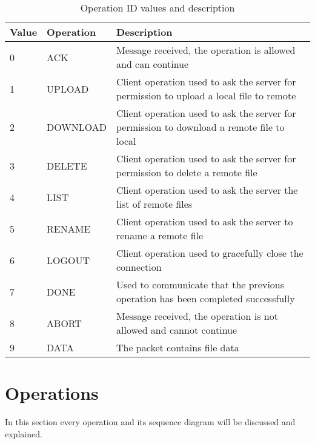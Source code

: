 \begin{longtable}{|p{}|p{}|p{}|}
	\caption{Operation ID values and description}
	\label{Operation ID list} 
	\label{tab:operation-ids-list} \\
	\hline
	\textbf{Value} & \textbf{Operation} & \textbf{Description} \\
	\hline
	 0 & ACK & Message received, the operation is allowed and can continue \\
	\hline
	 1 & UPLOAD & Client operation used to ask the server for permission to upload a local file to remote \\
	\hline
	 2 & DOWNLOAD & Client operation used to ask the server for permission to download a remote file to local \\
	\hline
	 3 & DELETE & Client operation used to ask the server for permission to delete a remote file \\
	\hline
	 4 & LIST & Client operation used to ask the server the list of remote files  \\
	\hline
	 5 & RENAME & Client operation used to ask the server to rename a remote file \\
	\hline
	 6 & LOGOUT & Client operation used to gracefully close the connection \\
	\hline
	 7 & DONE & Used to communicate that the previous operation has been completed successfully \\
	\hline
	 8 & ABORT & Message received, the operation is not allowed and cannot continue \\
	\hline
	 9 & DATA & The packet contains file data \\
	\hline
\end{longtable}%

\section{Operations}

In this section every operation and its sequence diagram will be discussed and explained.

